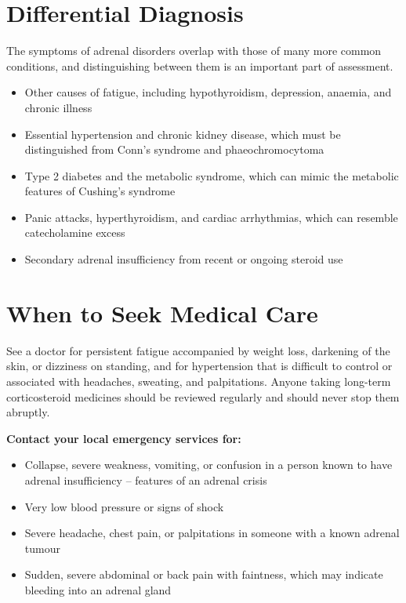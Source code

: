 \section*{Differential Diagnosis}
The symptoms of adrenal disorders overlap with those of many more common conditions, and distinguishing between them is an important part of assessment.

\begin{itemize}
    \item Other causes of fatigue, including hypothyroidism, depression, anaemia, and chronic illness
    \item Essential hypertension and chronic kidney disease, which must be distinguished from Conn's syndrome and phaeochromocytoma
    \item Type 2 diabetes and the metabolic syndrome, which can mimic the metabolic features of Cushing's syndrome
    \item Panic attacks, hyperthyroidism, and cardiac arrhythmias, which can resemble catecholamine excess
    \item Secondary adrenal insufficiency from recent or ongoing steroid use
\end{itemize}

\section*{When to Seek Medical Care}
See a doctor for persistent fatigue accompanied by weight loss, darkening of the skin, or dizziness on standing, and for hypertension that is difficult to control or associated with headaches, sweating, and palpitations. Anyone taking long-term corticosteroid medicines should be reviewed regularly and should never stop them abruptly.

\textbf{Contact your local emergency services for:}
\begin{itemize}
    \item Collapse, severe weakness, vomiting, or confusion in a person known to have adrenal insufficiency -- features of an adrenal crisis
    \item Very low blood pressure or signs of shock
    \item Severe headache, chest pain, or palpitations in someone with a known adrenal tumour
    \item Sudden, severe abdominal or back pain with faintness, which may indicate bleeding into an adrenal gland
\end{itemize}

